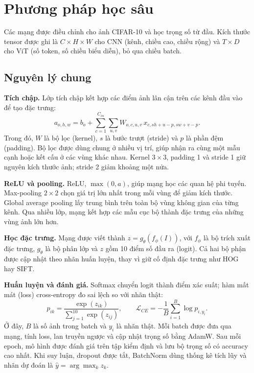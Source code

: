 \section{Phương pháp học sâu}
Các mạng được điều chỉnh cho ảnh CIFAR-10 và học trọng số từ đầu.
Kích thước tensor được ghi là $C\times H\times W$ cho CNN
(kênh, chiều cao, chiều rộng) và $T\times D$ cho ViT
(số token, số chiều biểu diễn), bỏ qua chiều batch.

\subsection{Nguyên lý chung}
\textbf{Tích chập.} Lớp tích chập kết hợp các điểm ảnh lân cận trên các
kênh đầu vào để tạo đặc trưng:
\begin{equation}
 a_{o,h,w}=b_o+\sum_{c=1}^{C_{in}}\sum_{u,v}
 W_{o,c,u,v}\,x_{c,sh+u-p,sw+v-p}.
\end{equation}
Trong đó, $W$ là bộ lọc (kernel), $s$ là bước trượt (stride) và $p$ là
phần đệm (padding). Bộ lọc được dùng chung ở nhiều vị trí, giúp nhận ra
cùng một mẫu cạnh hoặc kết cấu ở các vùng khác nhau. Kernel $3\times3$,
padding 1 và stride 1 giữ nguyên kích thước ảnh; stride 2 giảm khoảng một nửa.

\textbf{ReLU và pooling.} ReLU, $\max(0,a)$, giúp mạng học các quan hệ
phi tuyến. Max-pooling $2\times2$ chọn giá trị lớn nhất trong mỗi vùng để
giảm kích thước. Global average pooling lấy trung bình trên toàn bộ vùng
không gian của từng kênh. Qua nhiều lớp, mạng kết hợp các mẫu cục bộ thành
đặc trưng của những vùng ảnh lớn hơn.

\textbf{Học đặc trưng.} Mạng được viết thành $z=g_\theta(f_\phi(I))$,
với $f_\phi$ là bộ trích xuất đặc trưng, $g_\theta$ là bộ phân lớp và $z$
gồm 10 điểm số đầu ra (logit). Cả hai bộ phận được cập nhật theo nhãn
huấn luyện, thay vì giữ cố định đặc trưng như HOG hay SIFT.

\textbf{Huấn luyện và đánh giá.} Softmax chuyển logit thành điểm xác suất;
hàm mất mát (loss) cross-entropy đo sai lệch so với nhãn thật:
\begin{equation}
 p_{ik}=\frac{\exp(z_{ik})}{\sum_{j=1}^{10}\exp(z_{ij})},\qquad
 \mathcal{L}_{CE}=-\frac{1}{B}\sum_{i=1}^{B}\log p_{i,y_i}.
\end{equation}
Ở đây, $B$ là số ảnh trong batch và $y_i$ là nhãn thật. Mỗi batch được đưa
qua mạng, tính loss, lan truyền ngược và cập nhật trọng số bằng AdamW.
Sau mỗi epoch, mô hình được đánh giá trên tập kiểm định và lưu bộ trọng số
có accuracy cao nhất. Khi suy luận, dropout được tắt, BatchNorm dùng
thống kê tích lũy và nhãn dự đoán là $\hat y=\arg\max_k z_k$.

